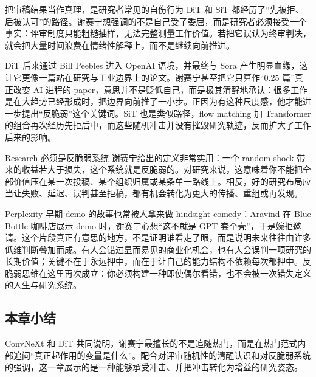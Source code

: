 \begin{warningbox}{把审稿结果当作真理，是研究者常见的自伤行为}
DiT 和 SiT 都经历了“先被拒、后被认可”的路径。谢赛宁想强调的不是自己受了委屈，而是研究者必须接受一个事实：评审制度只能粗糙抽样，无法完整测量工作价值。若把它误认为终审判决，就会把大量时间浪费在情绪性解释上，而不是继续向前推进。
\end{warningbox}

DiT 后来通过 Bill Peebles 进入 OpenAI 语境，并最终与 Sora 产生明显血缘，这让它更像一篇站在研究与工业边界上的论文。谢赛宁甚至把它只算作“0.25 篇”真正改变 AI 进程的 paper，意思并不是贬低自己，而是极其清醒地承认：很多工作是在大趋势已经形成时，把边界向前推了一小步。正因为有这种尺度感，他才能进一步提出“反脆弱”这个关键词。SiT 也是类似路径，flow matching 加 Transformer 的组合再次经历先拒后中，而这些随机冲击并没有摧毁研究轨迹，反而扩大了工作后来的影响。

\begin{importantbox}{Research 必须是反脆弱系统}
谢赛宁给出的定义非常实用：一个 random shock 带来的收益若大于损失，这个系统就是反脆弱的。对研究来说，这意味着你不能把全部价值压在某一次投稿、某个组织归属或某条单一路线上。相反，好的研究布局应当让失败、延迟、误判甚至拒稿，都有机会转化为更大的传播、重组或再发现。
\end{importantbox}

Perplexity 早期 demo 的故事也常被人拿来做 hindsight comedy：Aravind 在 Blue Bottle 咖啡店展示 demo 时，谢赛宁心想“这不就是 GPT 套个壳”，于是婉拒邀请。这个片段真正有意思的地方，不是证明谁看走了眼，而是说明未来往往由许多低维判断叠加而成。有人会错过显而易见的商业化机会，也有人会误判一项研究的长期价值；关键不在于永远押中，而在于让自己的能力结构不依赖每次都押中。反脆弱思维在这里再次成立：你必须构建一种即使偶尔看错，也不会被一次错失定义的人生与研究系统。

\subsection{本章小结}

ConvNeXt 和 DiT 共同说明，谢赛宁最擅长的不是追随热门，而是在热门范式内部追问“真正起作用的变量是什么”。配合对评审随机性的清醒认识和对反脆弱系统的强调，这一章展示的是一种能够承受冲击、并把冲击转化为增益的研究姿态。

